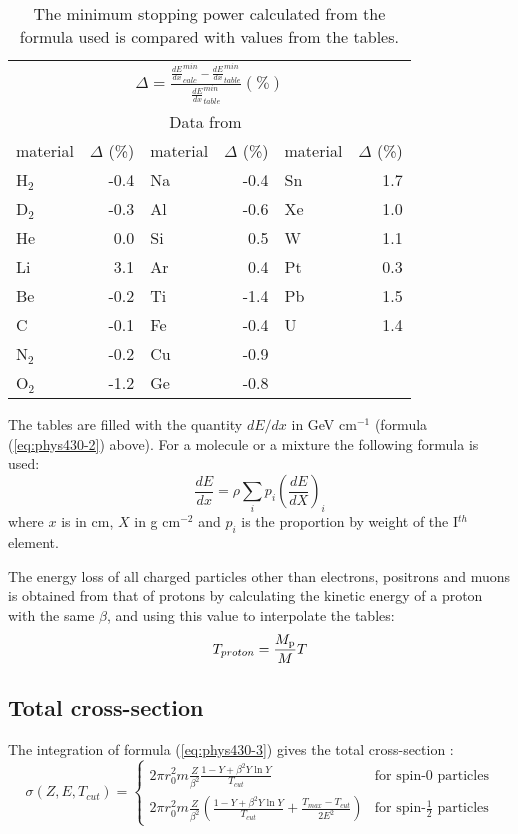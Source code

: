 \begin{table}
\begin{centering}
\begin{tabular}{|l|r||l|r||l|r|}
\multicolumn{6}{c}{$\displaystyle
\Delta = \frac{\frac{dE}{dx}^{min}_{calc} - \frac{dE}{dx}^{min}_{table}}
{\frac{dE}{dx}^{min}_{table}} (\%)$} \\[0.5cm]
\multicolumn{6}{c}{Data from~\cite{bib-BAR1}} \\
\hline
material & $\Delta$ (\%) & material & $\Delta$ (\%) 
& material & $\Delta$ (\%)\\
\hline
H$_{2}$ & -0.4 & Na & -0.4 & Sn & 1.7 \\
D$_{2}$ & -0.3 & Al & -0.6 & Xe & 1.0 \\
He & 0.0 & Si & 0.5 & W & 1.1 \\
Li & 3.1 & Ar & 0.4 & Pt & 0.3 \\
Be & -0.2 & Ti & -1.4 & Pb & 1.5 \\
C & -0.1 & Fe & -0.4  & U & 1.4 \\
N$_{2}$ & -0.2 & Cu & -0.9 & & \\
O$_{2}$ & -1.2 & Ge & -0.8  & & \\
\hline
\end{tabular}
\caption{The minimum stopping power
calculated from the formula used is compared
with values from the tables.}
\end{centering}
\label{tb:phys430-3}
\end{table}

The tables are filled with the quantity $dE/dx$ in GeV cm$^{-1}$
(formula (\ref{eq:phys430-2})
above). For a molecule or a mixture the following formula
is used:
\begin{equation}
\frac{dE} {dx} = \rho \sum_{i} p_i
      \left( \frac{dE}{dX} \right)_i
\end{equation}
where $x$ is in cm, $X$ in g cm$^{-2}$ and $p_{i}$ is the proportion
by weight of the I$^{th}$ element.

The energy loss of all charged particles other than electrons,
positrons and muons is obtained from that of protons 
by calculating the kinetic energy of a proton with the same
$\beta$, and using this value to interpolate the tables:
\begin{equation}
 T_{proton} =\frac{M_{\rm p}}{M}T
\end{equation}

\subsection{Total cross-section}
The integration of formula (\ref{eq:phys430-3}) gives the total cross-section :
\begin{equation}
\label{eq:phys430-4}
\sigma (Z,E,T_{cut}) = \left \{
\begin{array}{LL}
2 \pi r^2_0 m  \frac{Z}{\beta^2}
   \frac{1-Y+\beta^2 Y\ln Y}{T_{cut}} & \mbox{for spin-0 particles} \\ [.5cm]
2 \pi r^2_0 m  \frac{Z}{\beta^2} \left (\frac{1-Y+\beta^2 Y\ln Y}{T_{cut}}
+ \frac{T_{max}-T_{cut}} {2E^2} \right) & 
\mbox{for spin-}\frac{1}{2}\mbox{~particles}
\end{array} \right .
\end{equation}

